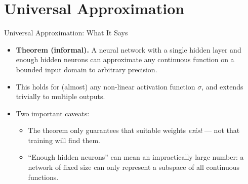 \section{Universal Approximation}


\begin{vbframe}{Universal Approximation: What It Says}
\begin{itemize}
\item \textbf{Theorem (informal).} A neural network with a single hidden layer and enough hidden neurons can approximate any continuous function on a bounded input domain to arbitrary precision.
\vspace{4mm}
\item This holds for (almost) any non-linear activation function $\sigma$, and extends trivially to multiple outputs.
\vspace{4mm}
\item Two important caveats:
  \begin{itemize}
    \item The theorem only guarantees that suitable weights \textit{exist} --- not that training will find them.
    \vspace{2mm}
    \item \enquote{Enough hidden neurons} can mean an impractically large number: a network of fixed size can only represent a subspace of all continuous functions.
  \end{itemize}
\end{itemize}
\end{vbframe}

